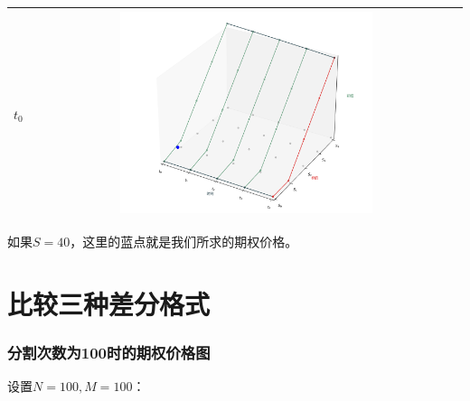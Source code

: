 \documentclass{article}
\begin{document}
\begin{longtable}{|c|c|}
    \hline
    $t_0$ & \includegraphics[width=0.6\textwidth]{Images/9_option_price_surface_4iter_step4.png} \\
    \hline
\end{longtable}

如果$S = 40$，这里的蓝点就是我们所求的期权价格。



\newpage
\section{比较三种差分格式}


\subsubsection{分割次数为100时的期权价格图}

设置$N=100, M=100$：
\end{document}

